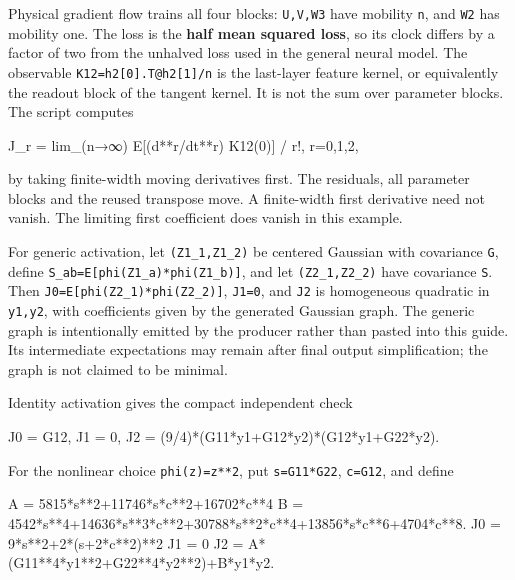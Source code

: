 \documentclass[
  11pt,
]{article}
\newenvironment{Shaded}{\begin{snugshade}}{\end{snugshade}}
\newcommand{\NormalTok}[1]{\textcolor[rgb]{0.00,0.23,0.31}{#1}}
\theoremstyle{definition}
\theoremstyle{plain}
\theoremstyle{plain}
\theoremstyle{plain}
\theoremstyle{remark}
\begin{document}
Physical gradient flow trains all four blocks: \texttt{U,V,W3} have
mobility \texttt{n}, and \texttt{W2} has mobility one. The loss is the
\textbf{half mean squared loss}, so its clock differs by a factor of two
from the unhalved loss used in the general neural model. The observable
\texttt{K12=h2{[}0{]}.T@h2{[}1{]}/n} is the last-layer feature kernel,
or equivalently the readout block of the tangent kernel. It is not the
sum over parameter blocks. The script computes

\begin{Shaded}
\begin{Highlighting}[]
\NormalTok{J\_r = lim\_(n→∞) E[(d**r/dt**r) K12(0)] / r!,   r=0,1,2,}
\end{Highlighting}
\end{Shaded}

by taking finite-width moving derivatives first. The residuals, all
parameter blocks and the reused transpose move. A finite-width first
derivative need not vanish. The limiting first coefficient does vanish
in this example.

For generic activation, let \texttt{(Z1\_1,Z1\_2)} be centered Gaussian
with covariance \texttt{G}, define
\texttt{S\_ab=E{[}phi(Z1\_a)*phi(Z1\_b){]}}, and let
\texttt{(Z2\_1,Z2\_2)} have covariance \texttt{S}. Then
\texttt{J0=E{[}phi(Z2\_1)*phi(Z2\_2){]}}, \texttt{J1=0}, and \texttt{J2}
is homogeneous quadratic in \texttt{y1,y2}, with coefficients given by
the generated Gaussian graph. The generic graph is intentionally emitted
by the producer rather than pasted into this guide. Its intermediate
expectations may remain after final output simplification; the graph is
not claimed to be minimal.

Identity activation gives the compact independent check

\begin{Shaded}
\begin{Highlighting}[]
\NormalTok{J0 = G12,  J1 = 0,}
\NormalTok{J2 = (9/4)*(G11*y1+G12*y2)*(G12*y1+G22*y2).}
\end{Highlighting}
\end{Shaded}

For the nonlinear choice \texttt{phi(z)=z**2}, put \texttt{s=G11*G22},
\texttt{c=G12}, and define

\begin{Shaded}
\begin{Highlighting}[]
\NormalTok{A = 5815*s**2+11746*s*c**2+16702*c**4}
\NormalTok{B = 4542*s**4+14636*s**3*c**2+30788*s**2*c**4+13856*s*c**6+4704*c**8.}
\NormalTok{J0 = 9*s**2+2*(s+2*c**2)**2}
\NormalTok{J1 = 0}
\NormalTok{J2 = A*(G11**4*y1**2+G22**4*y2**2)+B*y1*y2.}
\end{Highlighting}
\end{Shaded}
\end{document}
